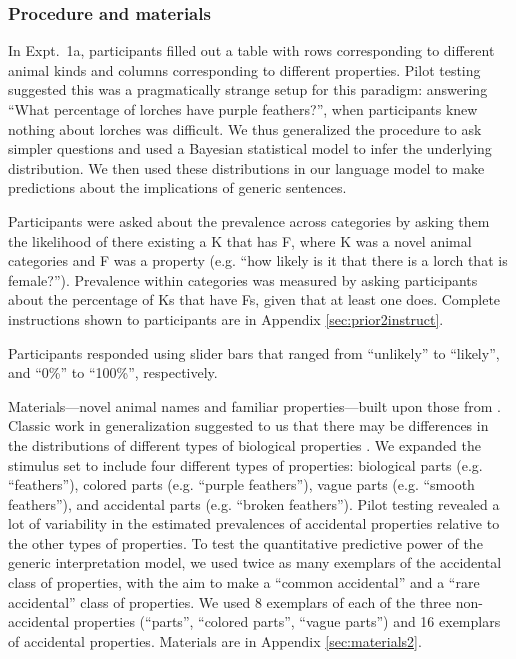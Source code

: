 \documentclass[10pt,letterpaper]{article}
\begin{document}
\subsubsection{Procedure and materials}

In Expt.~1a, participants filled out a table with rows corresponding to different animal kinds and columns corresponding to different properties. 
Pilot testing suggested this was a pragmatically strange setup for this paradigm: answering ``What percentage of lorches have purple feathers?'', when participants knew nothing about lorches was difficult.
We thus generalized the procedure to ask simpler questions and used a Bayesian statistical model to infer the underlying distribution. 
We then used these distributions in our language model to make predictions about the implications of generic sentences.

Participants were asked about the prevalence across categories by asking them the likelihood of there existing a K that has F, where K was a novel animal categories and F was a property (e.g. ``how likely is it that there is a lorch that is female?''). 
Prevalence within categories was measured by asking participants about the percentage of Ks that have Fs, given that at least one does.
Complete instructions shown to participants are in Appendix \ref{sec:prior2instruct}. 

Participants responded using slider bars that ranged from ``unlikely'' to ``likely'', and ``0\%'' to ``100\%'', respectively.

Materials---novel animal names and familiar properties---built upon those from . 
Classic work in generalization suggested to us that there may be differences in the distributions of different types of biological properties \cite{Nisbett1983}. 
We expanded the stimulus set to include four different types of properties: biological parts (e.g. ``feathers''), colored parts (e.g. ``purple feathers''), vague parts (e.g. ``smooth feathers''), and accidental parts (e.g. ``broken feathers''). 
Pilot testing revealed a lot of variability in the estimated prevalences of accidental properties relative to the other types of properties. 
To test the quantitative predictive power of the generic interpretation model, we used twice as many exemplars of the accidental class of properties, with the aim to make a ``common accidental'' and a ``rare accidental'' class of properties. 
We used 8 exemplars of each of the three non-accidental properties (``parts'', ``colored parts'', ``vague parts'') and 16 exemplars of accidental properties.
Materials are in Appendix \ref{sec:materials2}.
\end{document}
